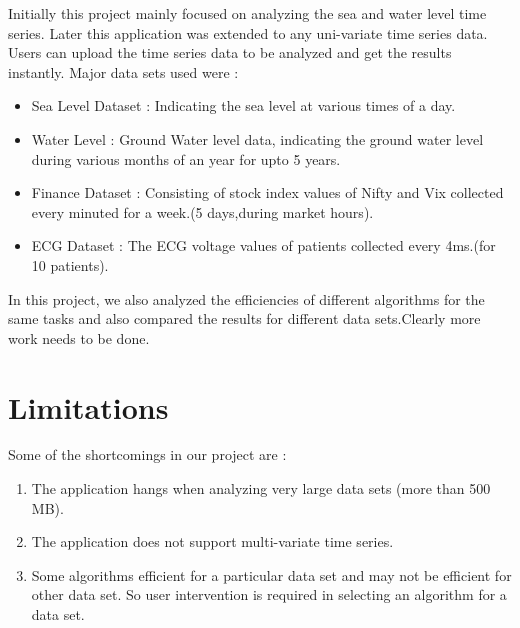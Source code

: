\documentclass[12pt,a4paper]{report}
\begin{document}
Initially this project mainly focused on analyzing the sea and water level time series. Later this application was extended to any uni-variate time series data. Users can upload the time series data to be analyzed and get the results instantly. Major data sets used were :
\begin{itemize}
\item Sea Level Dataset : Indicating the sea level at various times of a day.
\item Water Level : Ground Water level data, indicating the ground water level during various months of an year for upto 5 years.
\item Finance Dataset : Consisting of stock index values of  Nifty and Vix collected every minuted for a week.(5 days,during market hours).
\item ECG Dataset : The ECG  voltage values of patients collected every 4ms.(for 10 patients).
\end{itemize}


In this project, we also analyzed the efficiencies of different algorithms for the same tasks and also compared the results for different data sets.Clearly more work needs to be done.


\section{Limitations}
Some of the shortcomings in our project are :
\begin{enumerate}

\item{} The application hangs when analyzing very large data sets (more than 500 MB).
\item{} The application does not support multi-variate time series.
\item{}Some algorithms efficient for a particular data set and may not be efficient for other data set. So user intervention is required in selecting an algorithm for a data set.
\end{enumerate}
\end{document}
